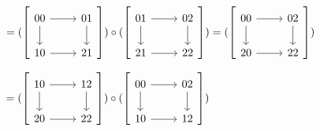      $=( \left[
    \begin{tikzcd}
        00
        \rar
        \dar
        &
        01
        \dar
        \\
        10
        \rar
        &
        21
    \end{tikzcd}
    \right] ) 
    \circ ( \left[ 
    \begin{tikzcd}
        01
        \rar
        \dar
        &
        02
        \dar
        \\
        21 
        \rar
        &
        22
    \end{tikzcd}
    \right] )
    =
    ( \left[
    \begin{tikzcd}
        00
        \rar
        \dar
        &
        02
        \dar
        \\
        20
        \rar
        &
        22
    \end{tikzcd}
    \right] )$ 

    
    $=
    ( \left[
    \begin{tikzcd}
        10
        \rar
        \dar
        &
        12
        \dar
        \\
        20
        \rar
        &
        22
    \end{tikzcd}
    \right] ) \circ
    ( \left[
    \begin{tikzcd}
        00
        \rar
        \dar
        &
        02
        \dar
        \\
        10
        \rar
        &
        12
    \end{tikzcd}
    \right] ) 
$
